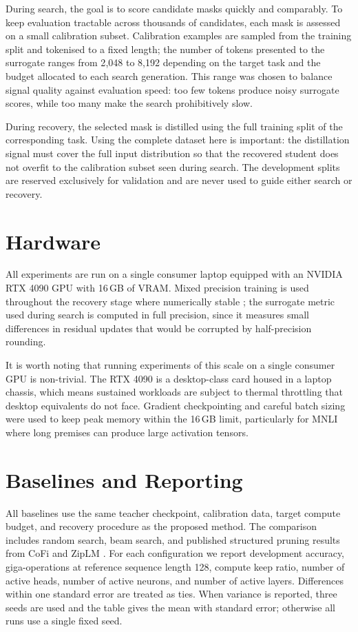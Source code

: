 During search, the goal is to score candidate masks quickly and comparably.
To keep evaluation tractable across thousands of candidates, each mask is
assessed on a small calibration subset. Calibration examples are sampled from
the training split and tokenised to a fixed length; the number of tokens
presented to the surrogate ranges from 2{,}048 to 8{,}192 depending on the
target task and the budget allocated to each search generation. This range was
chosen to balance signal quality against evaluation speed: too few tokens produce
noisy surrogate scores, while too many make the search prohibitively slow.

During recovery, the selected mask is distilled using the full training split
of the corresponding task. Using the complete dataset here is important: the
distillation signal must cover the full input distribution so that the recovered
student does not overfit to the calibration subset seen during search. The
development splits are reserved exclusively for validation and are never used to
guide either search or recovery.

\section{Hardware}
\label{sec:hardware}

All experiments are run on a single consumer laptop equipped with an
NVIDIA RTX 4090 GPU with 16\,GB of VRAM. Mixed precision training is used
throughout the recovery stage where numerically stable \citep{micikevicius2018mixed};
the surrogate metric used during search is computed in full precision, since it
measures small differences in residual updates that would be corrupted by
half-precision rounding.

It is worth noting that running experiments of this scale on a single
consumer GPU is non-trivial. The RTX 4090 is a desktop-class card housed in a
laptop chassis, which means sustained workloads are subject to thermal throttling
that desktop equivalents do not face. Gradient checkpointing and careful batch
sizing were used to keep peak memory within the 16\,GB limit, particularly for
MNLI where long premises can produce large activation tensors.

\section{Baselines and Reporting}
\label{sec:baselines}

All baselines use the same teacher checkpoint, calibration data, target compute
budget, and recovery procedure as the proposed method. The comparison includes
random search, beam search, and published structured pruning results from CoFi
\citep{xia2022cofi} and ZipLM \citep{kurtic2023ziplm}. For each configuration
we report development accuracy, giga-operations at reference sequence length
128, compute keep ratio, number of active heads, number of active neurons, and
number of active layers. Differences within one standard error are treated as
ties. When variance is reported, three seeds are used and the table gives the
mean with standard error; otherwise all runs use a single fixed seed.


